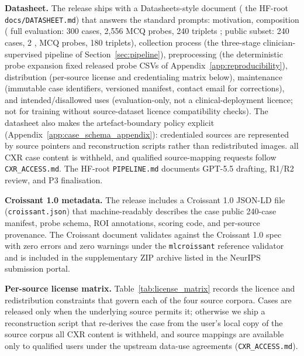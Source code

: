 \documentclass{article}
\providecommand{\DIFaddtex}[1]{{\protect\color{blue} \sf #1}} %
\providecommand{\DIFdeltex}[1]{{\protect\color{red} \scriptsize #1}} %
\providecommand{\DIFaddbegin}{} %
\providecommand{\DIFaddend}{} %
\providecommand{\DIFdelbegin}{} %
\providecommand{\DIFdelend}{} %
\providecommand{\DIFadd}[1]{\texorpdfstring{\DIFaddtex{#1}}{#1}} %
\providecommand{\DIFdel}[1]{\texorpdfstring{\DIFdeltex{#1}}{}} %
\begin{document}
\textbf{Datasheet.} The release ships with a Datasheets-style document \cite{gebru2021datasheets,pushkarna2022datacards} (\DIFaddbegin \DIFadd{the HF-root }\DIFaddend \texttt{\DIFdelbegin \DIFdel{docs/}\DIFdelend DATASHEET.md}) that answers the standard prompts: motivation, composition (\DIFaddbegin \DIFadd{full evaluation: }\DIFaddend 300 cases, 2{,}556 MCQ probes, 240 triplets\DIFaddbegin \DIFadd{; public subset: 240 cases, 2}{\DIFadd{,}}\DIFadd{002 MCQ probes, 180 triplets}\DIFaddend ), collection process (the three-stage clinician-supervised pipeline of Section~\ref{sec:pipeline}), preprocessing (the \DIFdelbegin \DIFdel{deterministic probe expansion }\DIFdelend \DIFaddbegin \DIFadd{fixed released probe CSVs }\DIFaddend of Appendix~\ref{app:reproducibility}), distribution (per-source license and credentialing matrix below), maintenance (immutable case identifiers, versioned manifest, contact email for corrections), and intended/disallowed uses (evaluation-only, not a clinical-deployment licence; not for training without source-dataset licence compatibility checks). The datasheet also makes the artefact-boundary policy explicit (Appendix~\ref{app:case_schema_appendix}): \DIFdelbegin \DIFdel{credentialed sources are represented by source pointers and reconstruction scripts rather than redistributed images. }\DIFdelend \DIFaddbegin \DIFadd{all CXR case content is withheld, and qualified source-mapping requests follow \texttt{CXR\_ACCESS.md}. The HF-root \texttt{PIPELINE.md} documents GPT-5.5 drafting, R1/R2 review, and P3 finalisation.
}\DIFaddend 

\textbf{Croissant 1.0 metadata.} The release includes a Croissant 1.0 \cite{mlcommons2024croissant} JSON-LD file (\texttt{croissant.json}) that machine-readably describes the \DIFdelbegin \DIFdel{case }\DIFdelend \DIFaddbegin \DIFadd{public 240-case }\DIFaddend manifest, probe schema, ROI annotations, scoring code, and per-source provenance. The Croissant document validates against the Croissant 1.0 spec with zero errors and zero warnings under the \texttt{mlcroissant} reference validator and is included in the supplementary ZIP archive listed in the NeurIPS submission portal.

\textbf{Per-source license matrix.} Table~\ref{tab:license_matrix} records the licence and redistribution constraints that govern each of the four source corpora. Cases are released only when the underlying source permits it; \DIFdelbegin \DIFdel{otherwise we ship a reconstruction script that re-derives the case from the user's local copy of the source corpus}\DIFdelend \DIFaddbegin \DIFadd{all CXR content is withheld, and source mappings are available only to qualified users under the upstream data-use agreements (\texttt{CXR\_ACCESS.md})}\DIFaddend .
\end{document}
